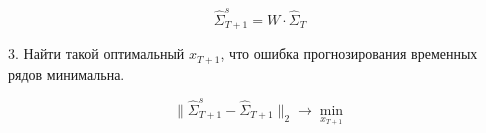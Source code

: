 \documentclass{article}
\begin{document}
\begin{equation}
	\hat{\Sigma}_{T+1}^s = W \cdot \hat{\Sigma}_{T}
\end{equation}


3. Найти такой оптимальный $x_{T+1}$, что ошибка прогнозирования временных рядов минимальна.

\begin{equation}
	\| \hat{\Sigma}_{T+1}^s - \hat{\Sigma}_{T+1} \|_2 \to \min_{x_{T+1}}
\end{equation}









\end{document}
